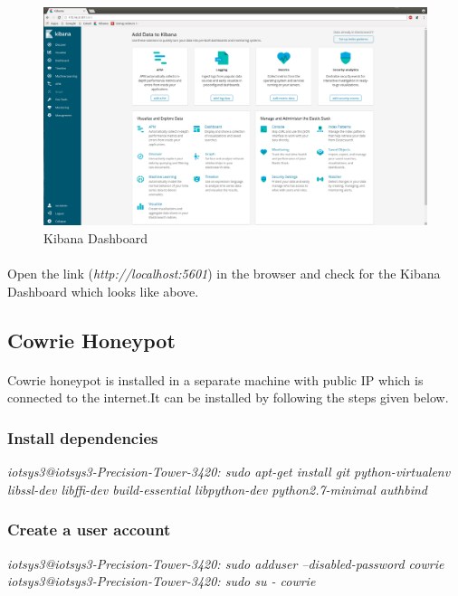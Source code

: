 \documentclass{article}
\begin{document}
\begin{figure}[H]
\centering
\caption{Kibana Dashboard}
\includegraphics[scale=0.22]{Kibana_Installation}
\end{figure}

\paragraph{}
Open the link (\textit{http://localhost:5601}) in the browser and check for the Kibana Dashboard which looks like above.


\subsection{Cowrie Honeypot}

\paragraph{}
Cowrie honeypot is installed in a separate machine with public IP which is connected to the internet.It can be installed by following the steps given below.

\subsubsection{Install dependencies } 
\textit{{\color{blue}iotsys3@iotsys3-Precision-Tower-3420:} sudo apt-get install git python-virtualenv libssl-dev libffi-dev build-essential libpython-dev python2.7-minimal authbind}

\subsubsection{Create a user account } 
\textit{{\color{blue}iotsys3@iotsys3-Precision-Tower-3420:} sudo adduser --disabled-password cowrie}\\
\textit{{\color{blue}iotsys3@iotsys3-Precision-Tower-3420:} sudo su - cowrie}
\end{document}
